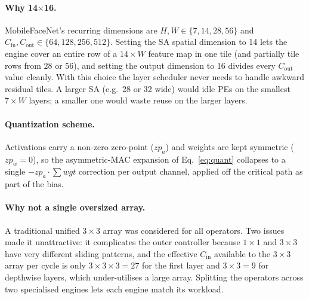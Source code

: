 \paragraph{Why 14$\times$16.}
MobileFaceNet's recurring dimensions are $H,W \in \{7, 14, 28, 56\}$ and $C_\text{in}, C_\text{out} \in \{64, 128, 256, 512\}$. Setting the SA spatial dimension to 14 lets the engine cover an entire row of a $14\times W$ feature map in one tile (and partially tile rows from $28$ or $56$), and setting the output dimension to 16 divides every $C_\text{out}$ value cleanly. With this choice the layer scheduler never needs to handle awkward residual tiles. A larger SA (e.g.\ 28 or 32 wide) would idle PEs on the smallest $7\times W$ layers; a smaller one would waste reuse on the larger layers.

\paragraph{Quantization scheme.}
Activations carry a non-zero zero-point ($\textit{zp}_a$) and weights are kept symmetric ($\textit{zp}_w = 0$), so the asymmetric-MAC expansion of Eq.~\eqref{eq:quant} collapses to a single $-zp_a \cdot \sum wgt$ correction per output channel, applied off the critical path as part of the bias.

\paragraph{Why not a single oversized array.}
A traditional unified $3\times3$ array was considered for all operators. Two issues made it unattractive: it complicates the outer controller because $1\times1$ and $3\times3$ have very different sliding patterns, and the effective $C_\text{in}$ available to the $3\times3$ array per cycle is only $3\times3\times3 = 27$ for the first layer and $3\times3 = 9$ for depthwise layers, which under-utilises a large array. Splitting the operators across two specialised engines lets each engine match its workload.
